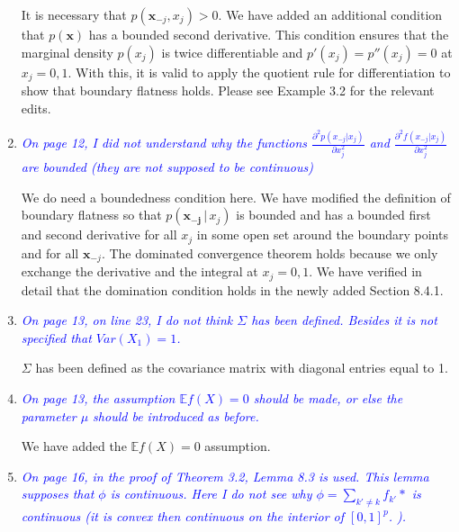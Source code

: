 \documentclass[pdftex,12pt]{article}
\def\E{{\mathbb E}}
\def\rc#1{{\it\textcolor{blue}{#1}}\smallskip}
\begin{document}
\begin{enumerate}
It is necessary that $p(\mathbf{x}_{-j}, x_j) > 0$. We have added an additional condition that $p(\mathbf{x})$ has a bounded second derivative. This condition ensures that the marginal density $p(x_j)$ is twice differentiable and $p'(x_j) = p''(x_j) = 0$ at $x_j = 0,1$. With this, it is valid to apply the quotient rule for differentiation to show that boundary flatness holds. Please see Example 3.2 for the relevant edits.


\item \rc{On page 12, I did not understand why the functions 
$\frac{\partial^2 p(x_{-j} |  x_j)}{\partial x_j^2}$
and 
$\frac{\partial^2 f(x_{-j} |  x_j)}{\partial x_j^2}$
are bounded (they are not supposed to be continuous)}


We do need a boundedness condition here. We have modified the
definition of boundary flatness so that $p(\mathbf{x_{-j}} \,|\, x_j)$
is bounded and has a bounded first and second derivative for all $x_j$
in some open set around the boundary points and for all
$\mathbf{x}_{-j}$. The dominated convergence theorem holds 
because we only exchange the derivative and the integral at $x_j =
0,1$. We have verified in detail that the domination condition holds
in the newly added Section 8.4.1.


\item \rc{On page 13, on line 23, I do not think $\Sigma$ has been defined. Besides it
is not specified that $Var(X_1) = 1$.}

$\Sigma$ has been defined as the covariance matrix with diagonal entries equal to 1.


\item \rc{On page 13, the assumption $\E f(X) = 0$ should be made, or else the
parameter $\mu$ should be introduced as before.}

We have added the $\E f(X) = 0$ assumption.


\item \rc{On page 16, in the proof of Theorem 3.2, Lemma 8.3 is used. This
lemma supposes that $\phi$ is continuous. Here I do not see why $\phi =
\sum_{k'\neq k} f_{k'}*$ is continuous (it is convex then continuous on the interior of
$[0,1]^p$. ).}


\end{enumerate}
\end{document}

